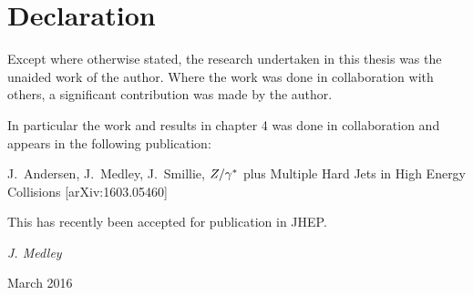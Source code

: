 \chapter*{Declaration}

\normalsize
Except where otherwise stated, the research undertaken in this thesis
was the unaided work of the author. Where the work was done in collaboration
with others, a significant contribution was made by the author.

In particular the work and results in chapter 4 was done in collaboration
and appears in the following publication:

\cite{ZPaper} J.~Andersen, J.~Medley, J.~Smillie, $Z/\gamma^*$ plus Multiple Hard Jets
in High Energy Collisions [arXiv:1603.05460]

This has recently been accepted for publication in JHEP.

\vspace{20mm}
\hfill {\it J. Medley}

\hfill March 2016


